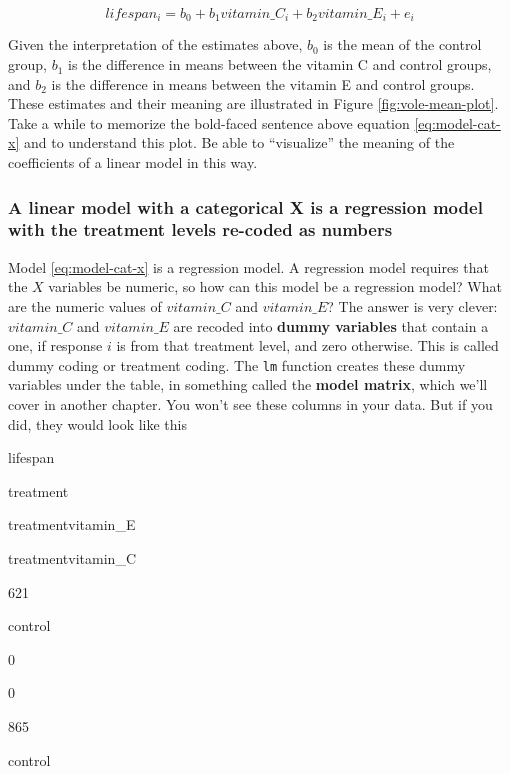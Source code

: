 \documentclass[]{book}
\begin{document}
\begin{equation}
lifespan_i = b_0 + b_1 vitamin\_C_i + b_2 vitamin\_E_i + e_i
\label{eq:model-cat-x}
\end{equation}

Given the interpretation of the estimates above, \(b_0\) is the mean of the control group, \(b_1\) is the difference in means between the vitamin C and control groups, and \(b_2\) is the difference in means between the vitamin E and control groups. These estimates and their meaning are illustrated in Figure \ref{fig:vole-mean-plot}. Take a while to memorize the bold-faced sentence above equation \eqref{eq:model-cat-x} and to understand this plot. Be able to ``visualize'' the meaning of the coefficients of a linear model in this way.

\hypertarget{a-linear-model-with-a-categorical-x-is-a-regression-model-with-the-treatment-levels-re-coded-as-numbers}{%
\subsubsection{A linear model with a categorical X is a regression model with the treatment levels re-coded as numbers}\label{a-linear-model-with-a-categorical-x-is-a-regression-model-with-the-treatment-levels-re-coded-as-numbers}}

Model \eqref{eq:model-cat-x} is a regression model. A regression model requires that the \(X\) variables be numeric, so how can this model be a regression model? What are the numeric values of \(vitamin\_C\) and \(vitamin\_E\)? The answer is very clever: \(vitamin\_C\) and \(vitamin\_E\) are recoded into \textbf{dummy variables} that contain a one, if response \(i\) is from that treatment level, and zero otherwise. This is called dummy coding or treatment coding. The \texttt{lm} function creates these dummy variables under the table, in something called the \textbf{model matrix}, which we'll cover in another chapter. You won't see these columns in your data. But if you did, they would look like this

lifespan

treatment

treatmentvitamin\_E

treatmentvitamin\_C

621

control

0

0

865

control
\end{document}
